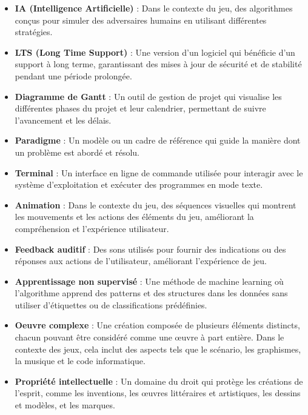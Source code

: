 \begin{itemize}
    \item \textbf{IA (Intelligence Artificielle)} : Dans le contexte du jeu, des algorithmes conçus pour simuler des adversaires humains en utilisant différentes stratégies.

    \item \textbf{LTS (Long Time Support)} : Une version d'un logiciel qui bénéficie d'un support à long terme, garantissant des mises à jour de sécurité et de stabilité pendant une période prolongée.

    \item \textbf{Diagramme de Gantt} : Un outil de gestion de projet qui visualise les différentes phases du projet et leur calendrier, permettant de suivre l'avancement et les délais.

    \item \textbf{Paradigme} : Un modèle ou un cadre de référence qui guide la manière dont un problème est abordé et résolu.

    \item \textbf{Terminal} : Un interface en ligne de commande utilisée pour interagir avec le système d'exploitation et exécuter des programmes en mode texte.

    \item \textbf{Animation} : Dans le contexte du jeu, des séquences visuelles qui montrent les mouvements et les actions des éléments du jeu, améliorant la compréhension et l'expérience utilisateur.

    \item \textbf{Feedback auditif} : Des sons utilisés pour fournir des indications ou des réponses aux actions de l'utilisateur, améliorant l'expérience de jeu.

    \item \textbf{Apprentissage non supervisé} : Une méthode de machine learning où l'algorithme apprend des patterns et des structures dans les données sans utiliser d'étiquettes ou de classifications prédéfinies.

    \item \textbf{Oeuvre complexe} : Une création composée de plusieurs éléments distincts, chacun pouvant être considéré comme une œuvre à part entière. Dans le contexte des jeux, cela inclut des aspects tels que le scénario, les graphismes, la musique et le code informatique.

    \item \textbf{Propriété intellectuelle} : Un domaine du droit qui protège les créations de l'esprit, comme les inventions, les œuvres littéraires et artistiques, les dessins et modèles, et les marques.


\end{itemize}
